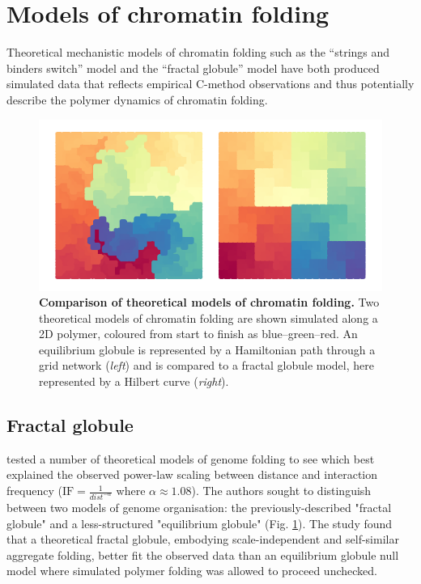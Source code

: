 \documentclass[a4paper,11pt,oneside]{book}
\begin{document}
\section{Models of chromatin folding}

Theoretical mechanistic models of chromatin folding such as the
``strings and binders switch'' model\cite{Barbieri2012} and the ``fractal
globule'' model\cite{Lieberman2009, Mirny2011, Grosberg1988a} have both produced simulated data
that reflects empirical C-method observations and thus potentially describe the polymer
dynamics of chromatin folding.

\begin{figure}
\begin{center}
\includegraphics[width=5.5in]{fractals.pdf}
\captionsetup{width=\textwidth}
\caption[ Comparison of theoretical models of chromatin folding. ]{ {\bf Comparison of theoretical models of chromatin folding. } 
 Two theoretical models of chromatin folding are shown simulated along a 2D polymer, coloured from start to finish as blue--green--red. An equilibrium globule is represented by a Hamiltonian path through a grid network (\emph{left}) and is compared to a fractal globule model, here represented by a Hilbert curve (\emph{right}).
}\label{fig:fractals}
\end{center}
\end{figure} 

\subsection{Fractal globule}
\citet{Lieberman2009} tested a number of theoretical models of genome folding to see which best explained the observed power-law scaling between distance and interaction frequency ($\textrm{IF} =  \frac{1}{dist^{-\alpha}}$ where $\alpha \approx 1.08$).  The authors sought to distinguish between two models of genome organisation: the previously-described "fractal globule"\cite{Grosberg1993, Grosberg1988a} and a less-structured "equilibrium globule" (Fig. \ref{fig:fractals}). The study found that a theoretical fractal globule, embodying scale-independent and self-similar aggregate folding, better fit the observed data than an equilibrium globule null model where simulated polymer folding was allowed to proceed unchecked.
\end{document}
